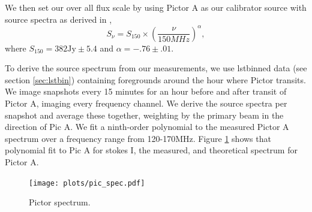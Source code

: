 \documentclass[twocolumn,numberedappendix]{emulateapj} \shorttitle{PSA64}
\begin{document}
%      
%
%

We then set our over all flux scale by using Pictor A as our calibrator source
with source spectra as derived in \cite{jacobs_et_al2013}, 
\begin{equation}
    S_{\nu} = S_{150}\times\left(\frac{\nu}{150MHz}\right)^{\alpha},
\end{equation}
where $S_{150} = 382 \text{Jy} \pm 5.4$ and $\alpha = -.76 \pm .01$.

To derive the source spectrum from our measurements, we use lstbinned data (see
section \ref{sec:lstbin}) containing foregrounds around the hour where Pictor
transits. We image snapshots every 15 minutes for an hour before and after
transit of Pictor A, imaging every frequency channel. We derive the source
spectra per snapshot and average these together, weighting by the primary beam
in the direction of Pic A. We fit a ninth-order polynomial to the measured
Pictor A spectrum over a frequency range from 120-170MHz. Figure
\ref{fig:pic_spec} shows that polynomial fit to Pic A for stokes I, the
measured, and theoretical spectrum for Pictor A.

\begin{figure}
\centering
\texttt{[image: plots/pic\_spec.pdf]}
\caption{Pictor spectrum.}
\label{fig:pic_spec}
\end{figure}
\end{document}
